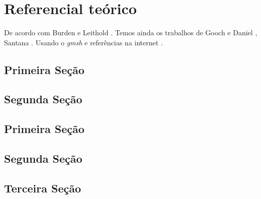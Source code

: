 \chapter{Referencial teórico}

\lipsum[1-2]


De acordo com Burden \cite{burden} e Leithold \cite{leithold}. 
Temos ainda os trabalhos de Gooch e Daniel \cite{gooch,daniel}, 
Santana \cite{santana}. Usando o \emph{gmsh} \cite{gmsh} e 
referências na internet \cite{wiki:quadrature}.

\section{Primeira Seção}

\lipsum[3-4]


\section{Segunda Seção}

\lipsum[5-6]


\section{Primeira Seção}

\lipsum[3-4]


\section{Segunda Seção}

\lipsum[5-6]


\section{Terceira Seção}

